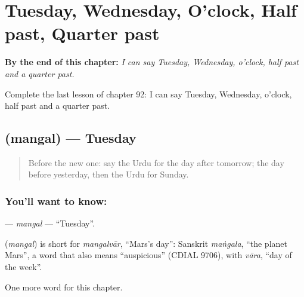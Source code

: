 
\chapter{Tuesday, Wednesday, O'clock, Half past, Quarter past}
\label{ch:ur-tuesday-wednesday-o-clock-half-past-quarter-past}

\begin{chapteropening}
\textbf{By the end of this chapter:} \emph{I can say Tuesday, Wednesday, o'clock, half past and a quarter past.}

Complete the last lesson of chapter 92: I can say Tuesday, Wednesday, o'clock, half past and a quarter past.
\end{chapteropening}

\section[\texorpdfstring{\ur{منگل} (mangal)}{منگل (mangal)}]{ (mangal) — Tuesday}

\label{lesson:UR-C92-mangal}



\begin{quote}
Before the new one: say the Urdu for the day after tomorrow; the day before yesterday, then the Urdu for Sunday.
\end{quote}

\subsection*{You'll want to know: }
\textbf{} — \emph{mangal} — \textquotedblleft{}Tuesday\textquotedblright{}.

\begin{cousinweb}
\textbf{} (\emph{mangal}) is short for \emph{mangalvār}, \textquotedblleft{}Mars's day\textquotedblright{}: Sanskrit \emph{maṅgala}, \textquotedblleft{}the planet Mars\textquotedblright{}, a word that also means \textquotedblleft{}auspicious\textquotedblright{} (CDIAL 9706), with \emph{vāra}, \textquotedblleft{}day of the week\textquotedblright{}.
\end{cousinweb}

\begin{grammarlens}[title={What you've built}]
One more word for this chapter.
\end{grammarlens}

